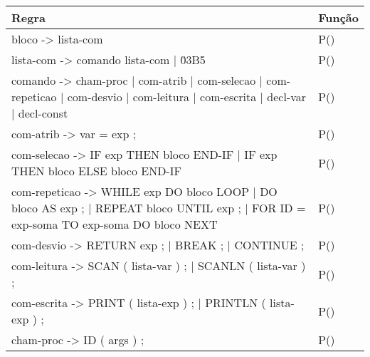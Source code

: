 \documentclass[12pt,oneside,a4paper,chapter=TITLE,section=TITLE,sumario=tradicional]{abntex2}
\begin{document}
\begin{quadro}[htb]
    \centering
    \vspace{0.5cm}
    \begin{tabular}[h]{|p{13.0cm}|p{2.0cm}|}
        \hline
        \textbf{Regra} & \textbf{Função} \\ 
        \hline\hline
	bloco -> lista-com  & P()   \\ \hline 
	lista-com -> comando lista-com | \u03B5  & P()   \\ \hline 
	comando -> cham-proc | com-atrib | com-selecao | com-repeticao | com-desvio | com-leitura | com-escrita | decl-var | decl-const  & P()   \\ \hline 
	com-atrib -> var = exp ;  & P()   \\ \hline 
	com-selecao -> IF exp THEN bloco END-IF | IF exp THEN bloco ELSE bloco END-IF  & P()   \\ \hline 
	com-repeticao -> WHILE  exp DO bloco LOOP | DO bloco AS  exp  ; |  REPEAT bloco UNTIL exp ; | FOR ID = exp-soma TO exp-soma DO bloco NEXT  & P()   \\ \hline 
	com-desvio -> RETURN exp ; | BREAK ; | CONTINUE ;  & P()   \\ \hline 
	com-leitura -> SCAN ( lista-var ) ; | SCANLN ( lista-var ) ;  & P()   \\ \hline 
	com-escrita -> PRINT ( lista-exp ) ; | PRINTLN ( lista-exp ) ;  & P()   \\ \hline 
	cham-proc -> ID ( args ) ;  & P()   \\ \hline 
    \end{tabular}    
\end{quadro}
\end{document}
